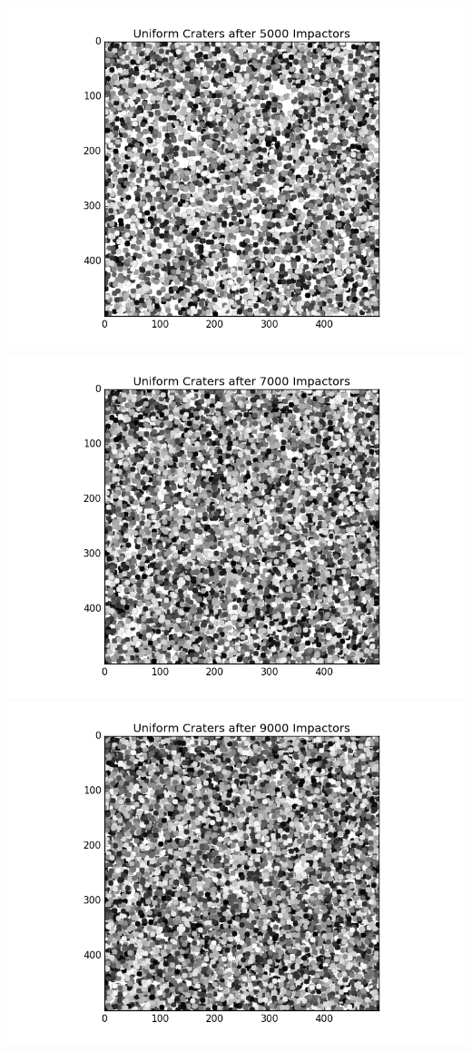 \documentclass[11pt]{article}
\begin{document}
\includegraphics[scale=.4]{Uniform5.png}
\includegraphics[scale=.4]{Uniform7.png}\\
\includegraphics[scale=.4]{Uniform9.png}
\end{document}
